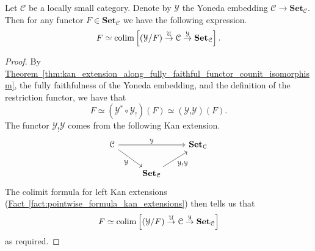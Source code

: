 \documentclass[main.tex]{subfiles}
\begin{document}
\begin{lemma}
  \label{lemma:colimit_of_comma_category}
  Let $\mathcal{C}$ be a locally small category. Denote by $\mathcal{Y}$ the Yoneda embedding $\mathcal{C} \to \mathbf{Set}_{\mathcal{C}}$. Then for any functor $F\in \mathbf{Set}_{\mathcal{C}}$ we have the following expression.
  \begin{equation*}
    F \simeq \operatorname*{colim} \left[ (\mathcal{Y} / F) \overset{\mathcal{U}}{\to} \mathcal{C} \overset{\mathcal{Y}}{\to} \mathbf{Set}_{\mathcal{C}} \right].
  \end{equation*}
\end{lemma}
\begin{proof}
  By \hyperref[thm:kan_extension_along_fully_faithful_functor_counit_isomorphism]{Theorem~\ref*{thm:kan_extension_along_fully_faithful_functor_counit_isomorphism}}, the fully faithfulness of the Yoneda embedding, and the definition of the restriction functor, we have that
  \begin{equation*}
    F \simeq (\mathcal{Y}^{*} \circ \mathcal{Y}_{!})(F) \simeq (\mathcal{Y}_{!}\mathcal{Y})(F).
  \end{equation*}
  The functor $\mathcal{Y}_{!}\mathcal{Y}$ comes from the following Kan extension.
  \begin{equation*}
    \begin{tikzcd}
      \mathcal{C}
      \arrow[rr, "\mathcal{Y}"]
      \arrow[dr, swap, "\mathcal{Y}"]
      && \mathbf{Set}_{\mathcal{C}}
      \\
      & \mathbf{Set}_{\mathcal{C}}
      \arrow[ur, swap, "\mathcal{Y}_{!} \mathcal{Y}"]
    \end{tikzcd}
  \end{equation*}
  The colimit formula for left Kan extensions (\hyperref[fact:pointwise_formula_kan_extensions]{Fact~\ref*{fact:pointwise_formula_kan_extensions}}) then tells us that
  \begin{equation*}
    F \simeq \operatorname*{colim} \left[ (\mathcal{Y}/F) \overset{\mathcal{U}}{\to} \mathcal{C} \overset{\mathcal{Y}}{\to} \mathbf{Set}_{\mathcal{C}} \right]
  \end{equation*}
  as required.

\end{proof}
\end{document}
